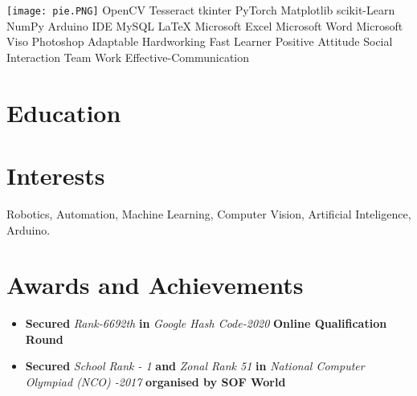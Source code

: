 \documentclass[letterpaper]{twentysecondcv} %
\begin{document}
\aboutme{}

\begin{aside}
\vspace{6cm}
\newline
\texttt{[image: pie.PNG]}
OpenCV
Tesseract
tkinter
PyTorch
Matplotlib
scikit-Learn
NumPy
Arduino IDE
MySQL
\LaTeX
Microsoft Excel
Microsoft Word
Microsoft Viso
Photoshop
Adaptable 
Hardworking
Fast Learner
Positive Attitude 
Social Interaction
Team Work 
Effective-Communication
\end{aside}
\makeprofile


\section{Education}
\begin{twenty} %
\end{twenty}


\section{Interests}
Robotics, Automation, Machine Learning, Computer Vision, Artificial Inteligence, Arduino.


\section{Awards and Achievements}
\begin{itemize}
    \item \textbf{Secured}  \textit{Rank-6692th} \textbf{in} \textit{Google Hash Code-2020} \textbf{Online Qualification Round}
    \item \textbf{Secured}  \textit{School Rank - 1} \textbf{and} \textit{Zonal Rank 51} \textbf{in} \textit{National Computer Olympiad (NCO) -2017} \textbf{organised by SOF World}
\end{itemize}
\end{document}
